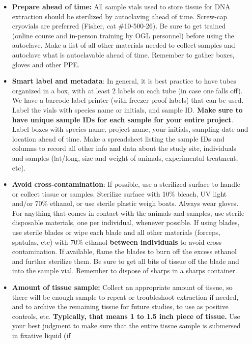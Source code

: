 \documentclass[
  letterpaper,
  DIV=11,
  numbers=noendperiod]{scrreprt}
\begin{document}
\begin{itemize}
\item
  \textbf{Prepare ahead of time:} All sample vials used to store tissue
  for DNA extraction should be sterilized by autoclaving ahead of time.
  Screw-cap cryovials are preferred (Fisher, cat \#10-500-26). Be sure
  to get trained (online course and in-person training by OGL personnel)
  before using the autoclave. Make a list of all other materials needed
  to collect samples and autoclave what is autoclavable ahead of time.
  Remember to gather boxes, gloves and other PPE.
\item
  \textbf{Smart label and metadata}: In general, it is best practice to
  have tubes organized in a box, with at least 2 labels on each tube (in
  case one falls off). We have a barcode label printer (with
  freezer-proof labels) that can be used. Label the vials with species
  name or initials, and sample ID. \textbf{Make sure to have unique
  sample IDs for each sample for your entire project}. Label boxes with
  species name, project name, your initials, sampling date and location
  ahead of time. Make a spreadsheet listing the sample IDs and columns
  to record all other info and data about the study site, individuals
  and samples (lat/long, size and weight of animals, experimental
  treatment, etc).
\item
  \textbf{Avoid cross-contamination}: If possible, use a sterilized
  surface to handle or collect tissue or samples. Sterilize surface with
  10\% bleach, UV light and/or 70\% ethanol, or use sterile plastic
  weigh boats. Always wear gloves. For anything that comes in contact
  with the animals and samples, use sterile disposable materials, one
  per individual, whenever possible. If using blades, use sterile blades
  or wipe each blade and all other materials (forceps, spatulas, etc)
  with 70\% ethanol \textbf{between individuals} to avoid
  cross-contamination. If available, flame the blades to burn off the
  excess ethanol and further sterilize them. Be sure to get all bits of
  tissue off the blade and into the sample vial. Remember to dispose of
  sharps in a sharps container.
\item
  \textbf{Amount of tissue sample:} Collect an appropriate amount of
  tissue, so there will be enough sample to repeat or troubleshoot
  extraction if needed, and to archive the remaining tissue for future
  studies, to use as positive controls, etc. \textbf{Typically, that
  means 1 to 1.5 inch piece of tissue.} Use your best judgment to make
  sure that the entire tissue sample is submersed in fixative liquid (if

\end{itemize}
\end{document}
